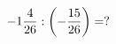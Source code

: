 \documentclass[preview]{standalone}
\begin{document}
\begin{align*}
-1 { 4 \over 26 }  :  \left( - { 15 \over 26 } \right)  =  ?
\end{align*}
\end{document}
